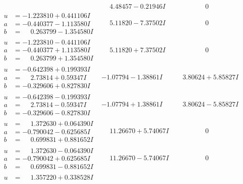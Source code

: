 \documentclass[1p]{elsarticle_modified}
\theoremstyle{definition}
\begin{document}
$$\begin{array}{c|c|c}
 & \phantom{-}4.48457 - 0.21946 I & \phantom{-0.000000 } 0 \\ \hline\begin{aligned}
u &= -1.223810 + 0.441106 I \\
a &= -0.440377 - 1.113580 I \\
b &= \phantom{-}0.263799 - 1.354580 I\end{aligned}
 & \phantom{-}5.11820 - 7.37502 I & \phantom{-0.000000 } 0 \\ \hline\begin{aligned}
u &= -1.223810 - 0.441106 I \\
a &= -0.440377 + 1.113580 I \\
b &= \phantom{-}0.263799 + 1.354580 I\end{aligned}
 & \phantom{-}5.11820 + 7.37502 I & \phantom{-0.000000 } 0 \\ \hline\begin{aligned}
u &= -0.642398 + 0.199393 I \\
a &= \phantom{-}2.73814 + 0.59347 I \\
b &= -0.329606 + 0.827830 I\end{aligned}
 & -1.07794 - 1.38861 I & \phantom{-}3.80624 + 5.85827 I \\ \hline\begin{aligned}
u &= -0.642398 - 0.199393 I \\
a &= \phantom{-}2.73814 - 0.59347 I \\
b &= -0.329606 - 0.827830 I\end{aligned}
 & -1.07794 + 1.38861 I & \phantom{-}3.80624 - 5.85827 I \\ \hline\begin{aligned}
u &= \phantom{-}1.372630 + 0.064390 I \\
a &= -0.790042 - 0.625685 I \\
b &= \phantom{-}0.699831 + 0.881652 I\end{aligned}
 & \phantom{-}11.26670 + 5.74067 I & \phantom{-0.000000 } 0 \\ \hline\begin{aligned}
u &= \phantom{-}1.372630 - 0.064390 I \\
a &= -0.790042 + 0.625685 I \\
b &= \phantom{-}0.699831 - 0.881652 I\end{aligned}
 & \phantom{-}11.26670 - 5.74067 I & \phantom{-0.000000 } 0 \\ \hline\begin{aligned}
u &= \phantom{-}1.357220 + 0.338528 I \\

\end{aligned}
\end{array}$$
\end{document}
